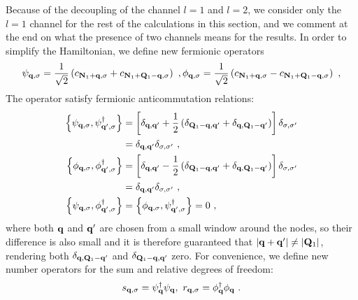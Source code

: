\documentclass[reprint,hidelinks,onecolumn]{revtex4-2}
\begin{document}
Because of the decoupling of the channel \(l=1\) and \(l=2\), we consider only the \(l=1\) channel for the rest of the calculations in this section, and we comment at the end on what the presence of two channels means for the results. In order to simplify the Hamiltonian, we define new fermionic operators
\begin{equation}\begin{aligned}
	\psi_{{\bf q}, \sigma} = \frac{1}{\sqrt 2}\left(c_{{\bf N}_1 + {\bf q},\sigma} + c_{{\bf N}_1 + {\bf Q}_1 - {\bf q}, \sigma}\right)~,
	\phi_{{\bf q}, \sigma} = \frac{1}{\sqrt 2}\left(c_{{\bf N}_1 + {\bf q},\sigma} - c_{{\bf N}_1 + {\bf Q}_1 - {\bf q}, \sigma}\right)~,
\end{aligned}\end{equation}
The operator satisfy fermionic anticommutation relations:
\begin{equation}\begin{aligned}
	\left\{ \psi_{{\bf q},\sigma}, {\psi}^\dagger_{{\bf q}^\prime,\sigma} \right\} &= \left[\delta_{{\bf q}, {\bf q}^\prime} + \frac{1}{2}\left(\delta_{{\bf Q}_1 - {\bf q}, {\bf q}^\prime} + \delta_{{\bf q}, {\bf Q}_1 - {\bf q}^\prime}\right)  \right] \delta_{\sigma,\sigma^\prime} \\
																							   &= \delta_{{\bf q}, {\bf q}^\prime}\delta_{\sigma,\sigma^\prime}~,\\
	\left\{ \phi_{{\bf q},\sigma}, {\phi}^\dagger_{{\bf q}^\prime,\sigma} \right\} &= \left[\delta_{{\bf q}, {\bf q}^\prime} - \frac{1}{2}\left(\delta_{{\bf Q}_1 - {\bf q}, {\bf q}^\prime} + \delta_{{\bf q}, {\bf Q}_1 - {\bf q}^\prime}\right)  \right] \delta_{\sigma,\sigma^\prime} \\
																				  &= \delta_{{\bf q}, {\bf q}^\prime}\delta_{\sigma,\sigma^\prime}~,\\
	\left\{ \psi_{{\bf q},\sigma}, {\phi}^\dagger_{{\bf q}^\prime,\sigma} \right\} &= \left\{ \phi_{{\bf q},\sigma}, {\psi}^\dagger_{{\bf q}^\prime,\sigma} \right\} = 0~,
\end{aligned}\end{equation}
where both \({\bf q}\) and \({\bf q}^\prime\) are chosen from a small window around the nodes, so their difference is also small and it is therefore guaranteed that \(|{\bf q} + {\bf q}^\prime| \neq |{\bf Q}_1|\), rendering both \(\delta_{{\bf q}, {\bf Q}_1 - {\bf q}^\prime}\) and \(\delta_{{\bf Q}_1 - {\bf q}, {\bf q}^\prime}\) zero. For convenience, we define new number operators for the sum and relative degrees of freedom:
\begin{equation}\begin{aligned}
	s_{{\bf q},\sigma} = {\psi}^\dagger_{{\bf q}} {\psi}_{{\bf q}},~ r_{{\bf q},\sigma} = {\phi}^\dagger_{{\bf q}} {\phi}_{{\bf q}}~.
\end{aligned}\end{equation}
\end{document}
